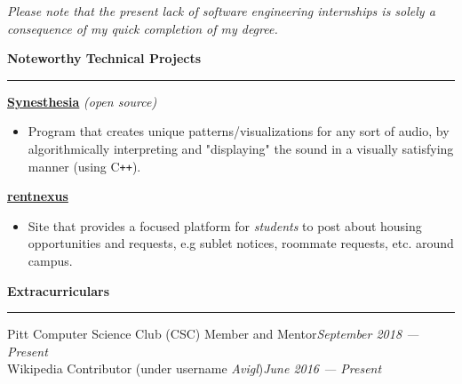 \documentclass[10pt]{article}
\begin{document}
\begin{flushleft}
		{\footnotesize \textit{Please note that the present lack of software engineering internships is solely a consequence of my quick completion of my degree.}}

		\vspace{1.25mm}
		{\large \raggedright \textbf{Noteworthy Technical Projects}}
		\vspace{1.25mm}
	
		\hrule
	
		\vspace{2.25mm}
		\textbf{\href{https://github.com/avigloz/synesthesia}{Synesthesia}} \textit{(open source)}
		\vspace{-2mm}
		\begin{itemize}
			\item Program that creates unique patterns/visualizations for any sort of audio, by algorithmically interpreting and "displaying" the sound in a visually satisfying manner (using C\texttt{++}).
		\end{itemize}
		\vspace{-2mm}
		\textbf{\href{https://rentnexus.net}{rentnexus}}
		\vspace{-2mm}
		\begin{itemize}
			\item Site that provides a focused platform for \textit{students} to post about housing opportunities and requests, e.g sublet notices, roommate requests, etc. around campus.
		\end{itemize}

		\vspace{1.5mm}
		{\large \raggedright \textbf{Extracurriculars}}
		\vspace{1.25mm}
	
		\hrule
	
		\vspace{2.25mm}
		Pitt Computer Science Club (CSC) Member and Mentor\hfill \textit{September 2018 --- Present}\\
		Wikipedia Contributor (under username \textit{Avigl})\hfill \textit{June 2016 --- Present}
		
	\end{flushleft}
\end{document}
